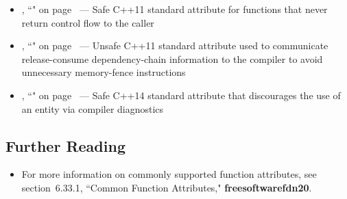 \begin{itemize}
\item{\locationa, ``" on page~\pageref{the-noreturn-attribute} — Safe C++11 standard attribute for functions that never return control flow to the caller}
\item{\locatione, ``" on page~\pageref{carriesdependency} — Unsafe C++11 standard attribute used to communicate release-consume dependency-chain information to the compiler to avoid unnecessary memory-fence instructions}
\item{\locationb, ``" on page~\pageref{deprecated} — Safe C++14 standard attribute that discourages the use of an entity via compiler diagnostics}
\end{itemize}

\subsection[Further Reading]{Further Reading}\label{attribute-further-reading}
\begin{itemize}
\item{For more information on commonly supported function attributes, see
section~6.33.1, ``Common Function Attributes," \textbf{{freesoftwarefdn20}}.}
\end{itemize}

